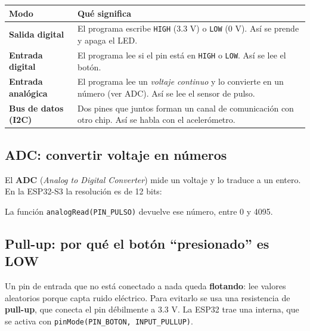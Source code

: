 \documentclass[11pt,a4paper]{article}
\begin{document}
\begin{center}
\begin{tabular}{@{}>{\bfseries}l p{11cm}@{}}
\toprule
Modo & Qué significa\\
\midrule
Salida digital & El programa escribe \texttt{HIGH} (3.3 V) o \texttt{LOW} (0 V). Así se prende y apaga el LED.\\
Entrada digital & El programa lee si el pin está en \texttt{HIGH} o \texttt{LOW}. Así se lee el botón.\\
Entrada analógica & El programa lee un \emph{voltaje continuo} y lo convierte en un número (ver ADC). Así se lee el sensor de pulso.\\
Bus de datos (I2C) & Dos pines que juntos forman un canal de comunicación con otro chip. Así se habla con el acelerómetro.\\
\bottomrule
\end{tabular}
\end{center}

\subsection{ADC: convertir voltaje en números}

El \textbf{ADC} (\emph{Analog to Digital Converter}) mide un voltaje y lo traduce a un entero.
En la ESP32-S3 la resolución es de 12 bits:

\begin{center}
\end{center}

La función \texttt{analogRead(PIN\_PULSO)} devuelve ese número, entre 0 y 4095.

\subsection{Pull-up: por qué el botón ``presionado'' es LOW}

Un pin de entrada que no está conectado a nada queda \textbf{flotando}: lee valores
aleatorios porque capta ruido eléctrico. Para evitarlo se usa una resistencia de
\textbf{pull-up}, que conecta el pin débilmente a 3.3 V. La ESP32 trae una interna, que
se activa con \texttt{pinMode(PIN\_BOTON, INPUT\_PULLUP)}.
\end{document}
